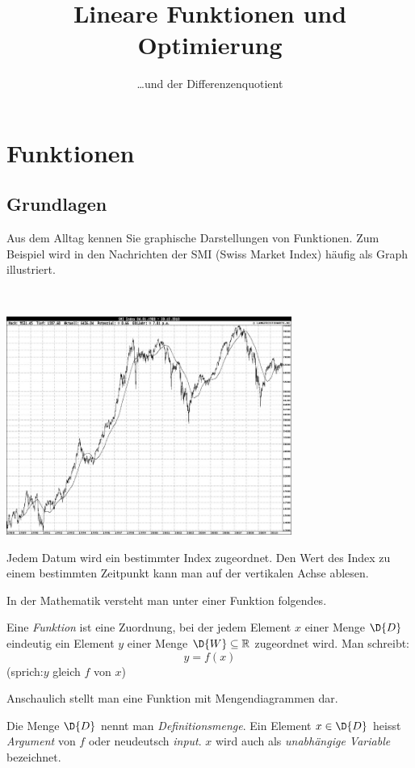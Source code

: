 \documentclass[%
11pt,%
twoside,%
titlepage,%
german,%
headsepline%
]{scrartcl}
\title{Lineare Funktionen und Optimierung}
\subtitle{\dots und der Differenzenquotient}
\author{}
\date{}
\begin{document}
\maketitle
\tableofcontents
\cleardoublepage

\section{Funktionen}
\subsection{Grundlagen}
Aus dem Alltag kennen Sie graphische Darstellungen von Funktionen. Zum Beispiel wird in den Nachrichten der SMI (Swiss Market Index) h\"aufig als Graph illustriert.
\begin{bsp}
\ \\
\begin{center}
\includegraphics[width=0.7\textwidth]{pictures/smi}
\end{center}
Jedem Datum wird ein bestimmter Index zugeordnet. Den Wert des Index zu einem bestimmten Zeitpunkt kann man auf der vertikalen Achse ablesen.
\end{bsp}
\noindent In der Mathematik versteht man unter einer Funktion folgendes.
\begin{cdef}[Funktion]{}
Eine \emph{Funktion} ist eine Zuordnung, bei der jedem Element $x$ einer Menge $\D{D}$ eindeutig ein Element $y$ einer Menge $\D{W}\subseteq\mathbb{R}$ zugeordnet wird. Man schreibt: $$y=f(x)$$
(sprich:\glqq $y$ gleich $f$ von $x$\grqq)
\end{cdef}
\noindent Anschaulich stellt man eine Funktion mit Mengendiagrammen dar.
\begin{cdef}{}
Die Menge $\D{D}$ nennt man \emph{Definitionsmenge}. Ein Element $x\in\D{D}$ heisst \emph{Argument} von $f$ oder neudeutsch \emph{input}. $x$ wird auch als \emph{unabh\"angige Variable} bezeichnet.
\end{cdef}
\end{document}
